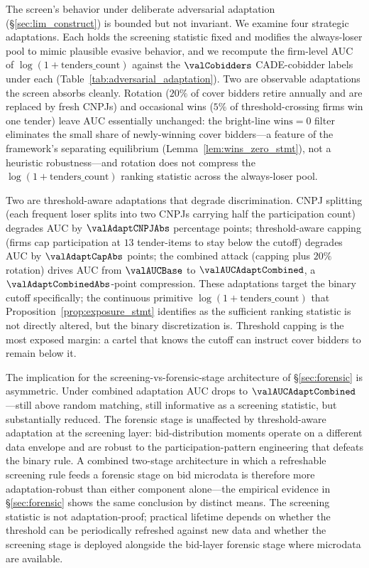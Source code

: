 The screen's behavior under deliberate adversarial adaptation
(\S\ref{sec:lim_construct}) is bounded but not invariant. We
examine four strategic adaptations. Each holds the screening
statistic fixed and modifies the always-loser pool to mimic
plausible evasive behavior, and we recompute the firm-level
AUC of $\log(1+\text{tenders\_count})$ against the
$\valCobidders$ CADE-cobidder labels under each
(Table~\ref{tab:adversarial_adaptation}). Two are observable
adaptations the screen absorbs cleanly. Rotation ($20\%$ of
cover bidders retire annually and are replaced by fresh CNPJs)
and occasional wins ($5\%$ of threshold-crossing firms win one
tender) leave AUC essentially unchanged: the bright-line
$\text{wins}=0$ filter eliminates the small share of
newly-winning cover bidders---a feature of the framework's
separating equilibrium (Lemma~\ref{lem:wins_zero_stmt}), not a
heuristic robustness---and rotation does not compress the
$\log(1+\text{tenders\_count})$ ranking statistic across the
always-loser pool.



Two are threshold-aware adaptations that degrade discrimination.
CNPJ splitting (each frequent loser splits into two CNPJs
carrying half the participation count) degrades AUC by
$\valAdaptCNPJAbs$ percentage points; threshold-aware capping
(firms cap participation at $13$ tender-items to stay below the
cutoff) degrades AUC by $\valAdaptCapAbs$ points; the combined
attack (capping plus $20\%$ rotation) drives AUC from
$\valAUCBase$ to $\valAUCAdaptCombined$, a
$\valAdaptCombinedAbs$-point compression. These adaptations
target the binary cutoff specifically; the continuous primitive
$\log(1+\text{tenders\_count})$ that
Proposition~\ref{prop:exposure_stmt} identifies as the
sufficient ranking statistic is not directly altered, but the
binary discretization is. Threshold capping is the most exposed
margin: a cartel that knows the cutoff can instruct cover
bidders to remain below it.

The implication for the screening-vs-forensic-stage architecture
of \S\ref{sec:forensic} is asymmetric. Under combined adaptation
AUC drops to $\valAUCAdaptCombined$---still above random
matching, still informative as a screening statistic, but
substantially reduced. The forensic stage is unaffected by
threshold-aware adaptation at the screening layer:
bid-distribution moments operate on a different data envelope
and are robust to the participation-pattern engineering that
defeats the binary rule. A combined two-stage architecture in
which a refreshable screening rule feeds a forensic stage on bid
microdata is therefore more adaptation-robust than either
component alone---the empirical evidence in \S\ref{sec:forensic}
shows the same conclusion by distinct means. The screening
statistic is not adaptation-proof; practical lifetime depends on
whether the threshold can be periodically refreshed against new
data and whether the screening stage is deployed alongside the
bid-layer forensic stage where microdata are available.

